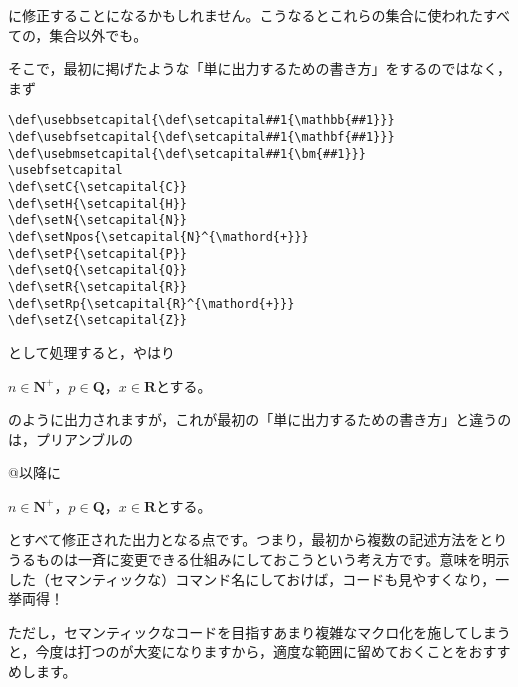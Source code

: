\documentclass[autodetect-engine,dvipdfmx]{jsarticle}
\begin{document}
に修正することになるかもしれません。こうなるとこれらの集合に使われたすべての\verb@{}\verb@{}，集合以外でも\verb@{}。

そこで，最初に掲げたような「単に出力するための書き方」をするのではなく，まず

\begin{tcolorbox}

\begin{verbatim}
\def\usebbsetcapital{\def\setcapital##1{\mathbb{##1}}}
\def\usebfsetcapital{\def\setcapital##1{\mathbf{##1}}}
\def\usebmsetcapital{\def\setcapital##1{\bm{##1}}}
\usebfsetcapital
\def\setC{\setcapital{C}}
\def\setH{\setcapital{H}}
\def\setN{\setcapital{N}}
\def\setNpos{\setcapital{N}^{\mathord{+}}}
\def\setP{\setcapital{P}}
\def\setQ{\setcapital{Q}}
\def\setR{\setcapital{R}}
\def\setRp{\setcapital{R}^{\mathord{+}}}
\def\setZ{\setcapital{Z}}
\end{verbatim}

\end{tcolorbox}

として処理すると，やはり

\begin{tcolorbox}
$n\in\mathbf{N}^{+}$，$p\in\mathbf{Q}$，$x\in\mathbf{R}$とする。
\end{tcolorbox}

のように出力されますが，これが最初の「単に出力するための書き方」と違うのは，プリアンブルの\verb@\usepackage{my-style}@以降に\verb@{}

\begin{tcolorbox}
$n\in\bm{N}^{+}$，$p\in\bm{Q}$，$x\in\bm{R}$とする。
\end{tcolorbox}

とすべて修正された出力となる点です。つまり，最初から複数の記述方法をとりうるものは一斉に変更できる仕組みにしておこうという考え方です。意味を明示した（セマンティックな）コマンド名にしておけば，コードも見やすくなり，一挙両得！

ただし，セマンティックなコードを目指すあまり複雑なマクロ化を施してしまうと，今度は打つのが大変になりますから，適度な範囲に留めておくことをおすすめします。
\end{document}
